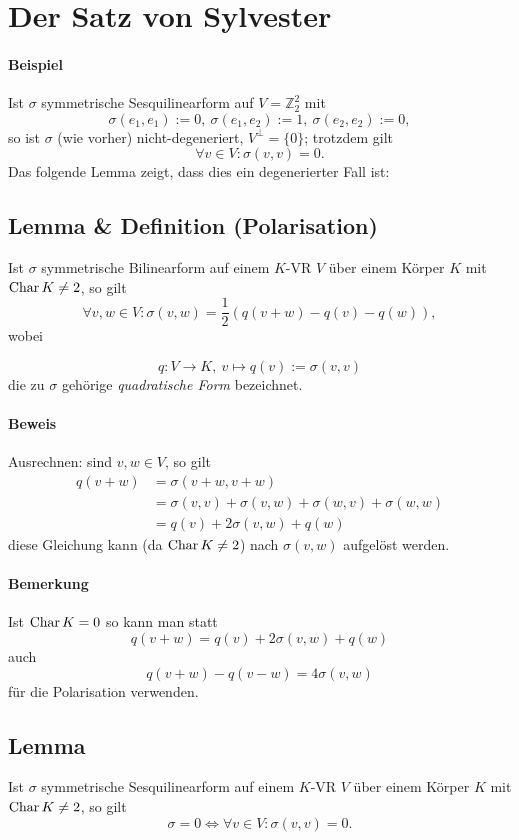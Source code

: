 \section{Der Satz von Sylvester}
\paragraph{Beispiel}
	Ist $ \sigma $ symmetrische Sesquilinearform auf $ V=\mathbb{Z}^2_2 $ mit
		\[ \sigma(e_1,e_1):=0,\ \sigma(e_1,e_2) := 1,\ \sigma(e_2,e_2) := 0, \]
	so ist $ \sigma $ (wie vorher) nicht-degeneriert, $ V^\perp =\{0\}$; trotzdem gilt
		\[ \forall v\in V: \sigma(v,v) = 0. \]
	Das folgende Lemma zeigt, dass dies ein degenerierter Fall ist:
	
\subsection{Lemma \& Definition (Polarisation)}
\begin{Lemma}[Polarisationslemma]	
	Ist $ \sigma $ symmetrische Bilinearform auf einem $ K $-VR $ V $ über einem Körper $ K $ mit $ \operatorname{Char} K \neq 2 $, so gilt
		\[ \forall v,w\in V: \sigma(v,w)=\frac{1}{2}\left(q(v+w)-q(v)-q(w)\right), \]
	wobei
\end{Lemma}
\begin{Definition}
		\[ q:V\to K,\ v\mapsto q(v):= \sigma(v,v) \]
	die zu $ \sigma $ gehörige \emph{quadratische Form} bezeichnet.
\end{Definition}
\paragraph{Beweis}
	Ausrechnen: sind $ v,w\in V $, so gilt
	\begin{align*}
	q(v+w) &= \sigma(v+w,v+w)\\
			&= \sigma(v,v) + \sigma(v,w)+\sigma(w,v)+\sigma(w,w)\\
			&= q(v)+2\sigma(v,w)+q(w)
	\end{align*}
	diese Gleichung kann (da $ \operatorname{Char} K\neq 2 $) nach $ \sigma(v,w) $ aufgelöst werden.
\paragraph{Bemerkung}
	Ist $ \operatorname{Char} K=0 $ so kann man statt
		\[ q(v+w)=q(v)+2\sigma(v,w)+q(w) \]
	auch
		\[ q(v+w)-q(v-w) = 4 \sigma(v,w) \]
	für die Polarisation verwenden.
	
\subsection{Lemma}
\begin{Lemma}[]
	Ist $ \sigma $ symmetrische Sesquilinearform auf einem $ K $-VR $ V $ über einem Körper $ K $ mit $ \operatorname{Char} K \neq 2 $, so gilt
		\[ \sigma = 0 \Leftrightarrow \forall v\in V: \sigma(v,v) = 0. \]
\end{Lemma}
